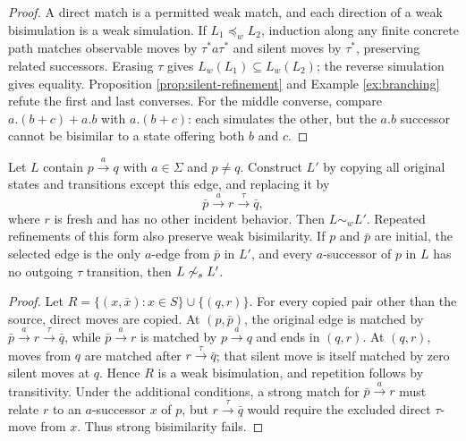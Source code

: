 \documentclass{ws-jbcb}
\numberwithin{equation}{section}
\newcommand{\TAU}{\tau}
\newcommand{\strongsim}{\mathrel{\sim_{s}}}
\newcommand{\weaksim}{\mathrel{\sim_{w}}}
\newcommand{\weakpre}{\mathrel{\preceq_{w}}}
\begin{document}
\begin{proof}
A direct match is a permitted weak match, and each direction of a weak
bisimulation is a weak simulation. If $L_1\weakpre L_2$, induction along any
finite concrete path matches observable moves by $\TAU^*a\TAU^*$ and silent
moves by $\TAU^*$, preserving related successors. Erasing $\TAU$ gives
$L_w(L_1)\subseteq L_w(L_2)$; the reverse simulation gives equality.
Proposition \ref{prop:silent-refinement} and Example \ref{ex:branching} refute
the first and last converses. For the middle converse, compare
$a.(b+c)+a.b$ with $a.(b+c)$: each simulates the other, but the $a.b$ successor
cannot be bisimilar to a state offering both $b$ and $c$.
\end{proof}

\begin{proposition}
\label{prop:silent-refinement}
Let $L$ contain $p\xrightarrow{a}q$ with $a\in\Sigma$ and $p\neq q$. Construct
$L'$ by copying all original states and transitions except this edge, and replacing
it by
\begin{equation}\label{eq:silent-refinement}
 \bar p\xrightarrow{a}r\xrightarrow{\TAU}\bar q,
\end{equation}
where $r$ is fresh and has no other incident behavior. Then $L\weaksim L'$.
Repeated refinements of this form also preserve weak bisimilarity. If $p$ and
$\bar p$ are initial, the selected edge is the only $a$-edge from $\bar p$ in
$L'$, and every $a$-successor of $p$ in $L$ has no outgoing $\TAU$ transition,
then $L\not\strongsim L'$.
\end{proposition}

\begin{proof}
Let
$R=\{(x,\bar x):x\in S\}\cup\{(q,r)\}$. For every copied pair other than the
source, direct moves are copied. At $(p,\bar p)$, the original edge is matched
by $\bar p\xrightarrow{a}r\xrightarrow{\TAU}\bar q$, while
$\bar p\xrightarrow{a}r$ is matched by $p\xrightarrow{a}q$ and ends in
$(q,r)$. At $(q,r)$, moves from $q$ are matched after
$r\xrightarrow{\TAU}\bar q$; that silent move is itself matched by zero silent
moves at $q$. Hence $R$ is a weak bisimulation, and repetition follows by
transitivity. Under the additional conditions, a strong match for
$\bar p\xrightarrow{a}r$ must relate $r$ to an $a$-successor $x$ of $p$, but
$r\xrightarrow{\TAU}\bar q$ would require the excluded direct $\TAU$-move from
$x$. Thus strong bisimilarity fails.
\end{proof}
\end{document}
